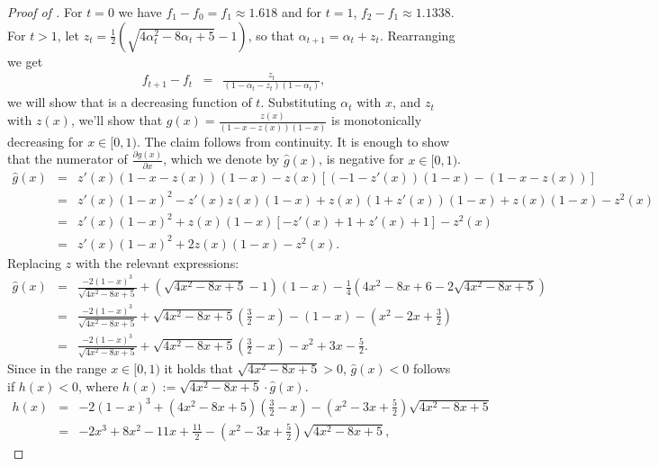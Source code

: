 \documentclass[11pt]{article}
\begin{document}
\begin{proof}[Proof of ]
For $t=0$ we have $f_1 - f_0 = f_1 \approx 1.618$ and for $t=1$, $f_2 - f_1 \approx 1.1338$. 
For $t>1$, let $z_t = \frac{1}{2}\left( \sqrt{4\alpha_t^2-8\alpha_t+5} - 1 \right)$, so that $\alpha_{t+1} = \alpha_t + z_t$.
    Rearranging we get
    \begin{eqnarray*}
        f_{t+1} - f_t &=&
        \frac{z_t}{(1-\alpha_t - z_t)(1-\alpha_t)},
    \end{eqnarray*}
    we will show that is a decreasing function of $t$.
    Substituting $\alpha_t$ with $x$, and $z_t$ with $z(x)$, we'll show that $g(x) = \frac{z(x)}{(1-x - z(x))(1-x)}$ 
    is monotonically decreasing for $x \in [0,1)$. The claim follows from continuity.
    It is enough to show that the numerator of $\frac{\partial g(x)}{\partial x}$, which we denote by $\hat{g}(x)$,  is negative for $x \in [0,1)$.
    \begin{eqnarray*}
        \hat{g}(x) &=& 
        z'(x)(1-x-z(x))(1-x) - z(x)[(-1-z'(x))(1-x) - (1-x-z(x))] \\
        &=& 
        z'(x)(1-x)^2 - z'(x)z(x)(1-x) 
        +z(x)(1+z'(x))(1-x)+z(x)(1-x) -z^2(x) \\
        &=& 
        z'(x)(1-x)^2 + z(x)(1-x)[-z'(x)+1+z'(x)+1] -z^2(x) \\
        &=& 
        z'(x)(1-x)^2 + 2z(x)(1-x) -z^2(x).
    \end{eqnarray*}
    Replacing $z$ with the relevant expressions:
    \begin{eqnarray*}
        \hat{g}(x)&=&
        \frac{-2(1-x)^3}{\sqrt{4x^2-8x+5}} + (\sqrt{4x^2-8x+5}-1)(1-x)-\frac{1}{4}(4x^2-8x+6 -2\sqrt{4x^2-8x+5}) \\
        &=&
        \frac{-2(1-x)^3}{\sqrt{4x^2-8x+5}} + 
        \sqrt{4x^2-8x+5}\left(\frac{3}{2}-x\right)-(1-x)-\left(x^2-2x+\frac{3}{2}\right) \\
        &=&
        \frac{-2(1-x)^3}{\sqrt{4x^2-8x+5}} + 
        \sqrt{4x^2-8x+5}\left(\frac{3}{2}-x\right) -x^2+3x-\frac{5}{2}.
    \end{eqnarray*}
    Since in the range $x \in [0,1)$ it holds that $\sqrt{4x^2-8x+5}>0$, $\hat{g}(x) < 0$ follows if $h(x) < 0$, where $h(x) := \sqrt{4x^2-8x+5} \cdot \hat{g}(x)$.
    \begin{eqnarray*}
        h(x) &=&
        -2(1-x)^3 + (4x^2-8x+5)\left(\frac{3}{2}-x\right)-\left(x^2-3x+\frac{5}{2}\right)\sqrt{4x^2-8x+5} \\
        &=&
        -2x^3+8x^2-11x+\frac{11}{2}-\left(x^2-3x+\frac{5}{2}\right)\sqrt{4x^2-8x+5}, 

\end{eqnarray*}
\end{proof}
\end{document}
